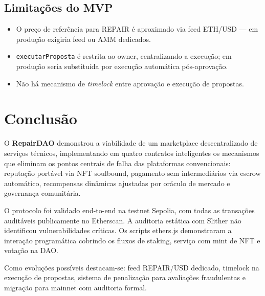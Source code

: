 \documentclass[
    12pt,
    a4paper,
    oneside,
    brazil,
    sumario=tradicional
]{abntex2}
\begin{document}
\subsection{Limitações do MVP}

\begin{itemize}
    \item O preço de referência para REPAIR é aproximado via feed
    ETH/USD --- em produção exigiria feed ou AMM dedicados.
    \item \texttt{executarProposta} é restrita ao owner, centralizando a
    execução; em produção seria substituída por execução
    automática pós-aprovação.
    \item Não há mecanismo de \textit{timelock} entre aprovação e
    execução de propostas.
\end{itemize}

\section{Conclusão}

O \textbf{RepairDAO} demonstrou a viabilidade de um marketplace
descentralizado de serviços técnicos, implementando em quatro
contratos inteligentes os mecanismos que eliminam os pontos centrais de
falha das plataformas convencionais: reputação portável via NFT
soulbound, pagamento sem intermediários via escrow automático,
recompensas dinâmicas ajustadas por oráculo de mercado e governança
comunitária.

O protocolo foi validado end-to-end na testnet Sepolia, com todas as
transações auditáveis publicamente no Etherscan. A auditoria estática
com Slither não identificou vulnerabilidades críticas. Os scripts
ethers.js demonstraram a interação programática cobrindo os fluxos
de staking, serviço com mint de NFT e votação na DAO.

Como evoluções possíveis destacam-se: feed REPAIR/USD dedicado,
timelock na execução de propostas, sistema de penalização para
avaliações fraudulentas e migração para mainnet com auditoria formal.

\postextual
\end{document}

